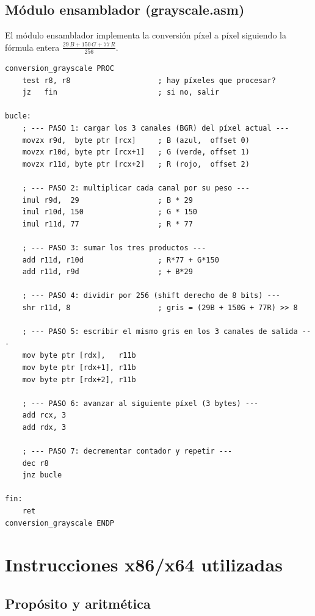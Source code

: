 \documentclass[12pt, letterpaper]{article}
\begin{document}
\subsection{Módulo ensamblador (grayscale.asm)}

El módulo ensamblador implementa la conversión píxel a píxel siguiendo la fórmula entera $\frac{29\,B + 150\,G + 77\,R}{256}$.

\begin{lstlisting}[language=MASM, caption={Rutina \texttt{conversion\_grayscale} completa}]
conversion_grayscale PROC
    test r8, r8                    ; hay píxeles que procesar?
    jz   fin                       ; si no, salir

bucle:
    ; --- PASO 1: cargar los 3 canales (BGR) del píxel actual ---
    movzx r9d,  byte ptr [rcx]     ; B (azul,  offset 0)
    movzx r10d, byte ptr [rcx+1]   ; G (verde, offset 1)
    movzx r11d, byte ptr [rcx+2]   ; R (rojo,  offset 2)

    ; --- PASO 2: multiplicar cada canal por su peso ---
    imul r9d,  29                  ; B * 29
    imul r10d, 150                 ; G * 150
    imul r11d, 77                  ; R * 77

    ; --- PASO 3: sumar los tres productos ---
    add r11d, r10d                 ; R*77 + G*150
    add r11d, r9d                  ; + B*29

    ; --- PASO 4: dividir por 256 (shift derecho de 8 bits) ---
    shr r11d, 8                    ; gris = (29B + 150G + 77R) >> 8

    ; --- PASO 5: escribir el mismo gris en los 3 canales de salida ---
    mov byte ptr [rdx],   r11b
    mov byte ptr [rdx+1], r11b
    mov byte ptr [rdx+2], r11b

    ; --- PASO 6: avanzar al siguiente píxel (3 bytes) ---
    add rcx, 3
    add rdx, 3

    ; --- PASO 7: decrementar contador y repetir ---
    dec r8
    jnz bucle

fin:
    ret
conversion_grayscale ENDP
\end{lstlisting}

\section{Instrucciones x86/x64 utilizadas}

\subsection{Propósito y aritmética}
\end{document}
